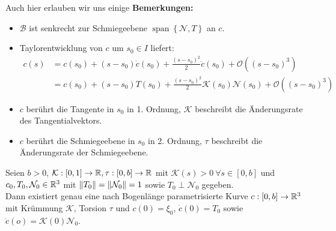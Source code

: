 Auch hier erlauben wir uns einige \textbf{Bemerkungen:}
\begin{itemize}
	\item $\mathcal{B}$ ist senkrecht zur Schmiegeebene $\operatorname{span}\left\{\mathcal{N},T\right\}$ an $c$.
	\item Taylorentwicklung von $c$ um $s_0 \in I$ liefert:
	\begin{align*}
	c(s) &= c(s_0)	+ (s-s_0)\dot{c}(s_0) + \frac{(s-s_0)^2}{2}\ddot{c}(s_0) + \mathcal{O}((s-s_0)^3) \\
	     &= c(s_0) + (s-s_0)T(s_0) + \frac{(s-s_0)^2}{2}\mathcal{K}(s_0)\mathcal{N}(s_0) + \mathcal{O}((s-s_0)^3)
	\end{align*}
	\item $c$ berührt die Tangente in $s_0$ in 1. Ordnung, $\mathcal{K}$ beschreibt die Änderungsrate des Tangentialvektors.
	\item $c$ berührt die Schmiegeebene in $s_0$ in 2. Ordnung, $\tau$ beschreibt die Änderungsrate der Schmiegeebene. 
\end{itemize}
\begin{satz}
	Seien $b>0$, $\mathcal{K}: [0,1]\rightarrow \mathbb{R}, \tau: [0,b]\rightarrow \mathbb{R}$ mit $\mathcal{K}(s)>0 \ \forall s \in [0,b]$ und $c_0, T_0, \mathcal{N}_0 \in \mathbb{R}^3$ mit $\norm{T_0} = \norm{\mathcal{N}_0} = 1$ sowie $T_0 \perp \mathcal{N}_0$ gegeben. \\
	Dann existiert genau eine nach Bogenlänge parametrisierte Kurve $c:[0,b]\rightarrow\mathbb{R}^3$ mit Krümmung $\mathcal{K}$, Torsion $\tau$ und $c(0) = \xi_0$, $\dot{c}(0) = T_0$ sowie $\ddot{c}(o) = \mathcal{K}(0)\mathcal{N}_0$.
\end{satz}
